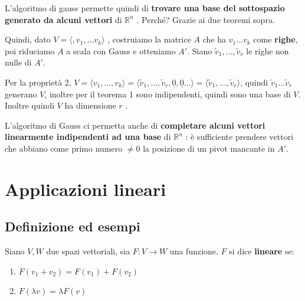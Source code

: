 \documentclass[
  a4paper,
]{article}
\providecommand{\tightlist}{%
  \setlength{\itemsep}{0pt}\setlength{\parskip}{0pt}}
\providecommand{\tightlist}{}
\begin{document}
L'algoritmo di gauss permette quindi di \textbf{trovare una base del
sottospazio generato da alcuni vettori} di \(\mathbb{R}^n\) . Perché?
Grazie ai due teoremi sopra.

Quindi, dato \(V = \langle, v_1 ,\dots v_k\rangle\) , costruiamo la
matrice \(A\) che ha \(v_1 \dots v_k\) come \textbf{righe}, poi
riduciamo \(A\) a scala con Gauss e otteniamo \(A'\). Siano
\(\tilde{v}_1 ,\dots ,\tilde{v}_r\) le righe non nulle di \(A'\).

Per la proprietà 2,
\(V = \langle v_1 ,\dots ,v_k\rangle = \langle \tilde{v}_1, \dots , \tilde{v}_r, \underline{0}, \underline{0} \dots \rangle = \langle \tilde{v}_1, \dots, \tilde{v}_r \rangle\),
quindi \(\tilde{v}_1 \dots \tilde{v}_r\) generano \(V\), inoltre per il
teorema 1 sono indipendenti, quindi sono una base di \(V\). Inoltre
quindi \(V\) ha dimensione \(r\) .

\begin{observationbox}
L'algoritmo di Gauss ci permetta anche di \textbf{completare alcuni
vettori linearmente indipendenti ad una base} di \(\mathbb{R}^n\) : è
sufficiente prendere vettori che abbiano come primo numero \(\neq 0\) la
posizione di un pivot mancante in \(A'\).
\end{observationbox}

\newpage

\hypertarget{applicazioni-lineari}{%
\section{Applicazioni lineari}\label{applicazioni-lineari}}

\hypertarget{definizione-ed-esempi}{%
\subsection{Definizione ed esempi}\label{definizione-ed-esempi}}

\begin{definitionbox}
Siano \(V, W\) due spazi vettoriali, sia \(F: V \to W\) una funzione.
\(F\) si dice \textbf{lineare} se:

\begin{enumerate}
\def\labelenumi{\arabic{enumi}.}
\tightlist
\item
  \(F(v_1 + v_2) = F(v_1) + F(v_2)\)
\item
  \(F(\lambda v) = \lambda F(v)\)
\end{enumerate}
\end{definitionbox}
\end{document}
